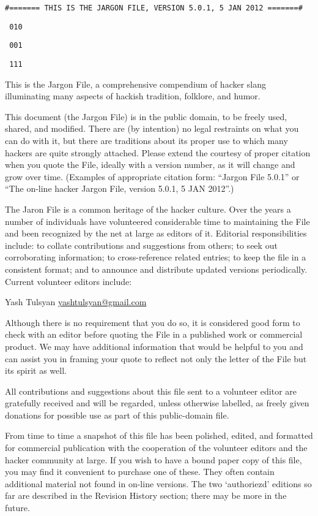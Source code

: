 \texttt{\#======= THIS IS THE JARGON FILE, VERSION 5.0.1, 5 JAN 2012 =======\#}

\texttt{\ 010}

\texttt{\ 001}

\texttt{\ 111}
\setlength{\parskip}{6pt}

This is the Jargon File, a comprehensive compendium of hacker slang illuminating many aspects of hackish tradition, folklore, and humor.

This document (the Jargon File) is in the public domain, to be freely used, shared, and modified. There are (by intention) no legal
restraints on what you can do with it, but there are traditions about its proper use to which many hackers are quite strongly attached.
Please extend the courtesy of proper citation when you quote the File, ideally with a version number, as it will change and grow over time.
(Examples of appropriate citation form: ``Jargon File 5.0.1'' or ``The on-line hacker Jargon File, version 5.0.1, 5 JAN 2012''.)

The Jaron File is a common heritage of the hacker culture. Over the years a number of individuals have volunteered considerable time to
maintaining the File and been recognized by the net at large as editors of it. Editorial responsibilities include: to collate contributions
and suggestions from others; to seek out corroborating information; to cross-reference related entries; to keep the file in a consistent
format; and to announce and distribute updated versions periodically. Current volunteer editors include:

Yash Tulsyan \url{yashtulsyan@gmail.com}

Although there is no requirement that you do so, it is considered good form to check with an editor before quoting the File in a published
work or commercial product. We may have additional information that would be helpful to you and can assist you in framing your quote to
reflect not only the letter of the File but its spirit as well.

All contributions and suggestions about this file sent to a volunteer editor are gratefully received and will be regarded, unless otherwise
labelled, as freely given donations for possible use as part of this public-domain file.

From time to time a snapshot of this file has been polished, edited, and formatted for commercial publication with the cooperation of the
volunteer editors and the hacker community at large. If you wish to have a bound paper copy of this file, you may find it convenient to
purchase one of these. They often contain additional material not found in on-line versions. The two `authoriezd' editions so far are
described in the Revision History section; there may be more in the future.


